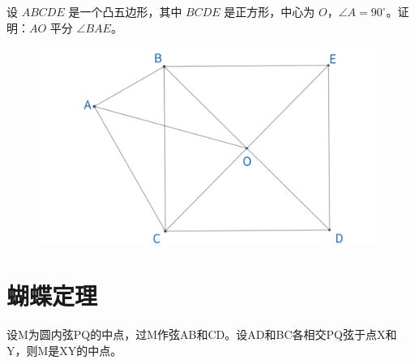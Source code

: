\begin{exercise}
设 $ABCDE$ 是一个凸五边形，其中 $BCDE$ 是正方形，中心为 $O$，$\angle A = 90^\circ$。证明：$AO$ 平分 $\angle BAE$。
\end{exercise}

\begin{figure}[H]
    \centering
    \includegraphics[width=0.7\linewidth]{figures/exercises/004.png}
\end{figure}


\newpage 
\section{蝴蝶定理}
\begin{theorem}
    设M为圆内弦PQ的中点，过M作弦AB和CD。设AD和BC各相交PQ弦于点X和Y，则M是XY的中点。
\end{theorem}

